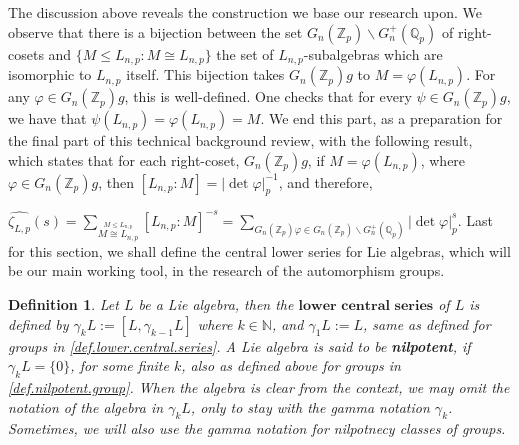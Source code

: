 \documentclass[12pt]{article}
\newtheorem{definition}[theorem]{Definition}
\begin{document}
The discussion above reveals the construction we base our research upon.
We observe that there is a bijection between the set $G_n(\mathbb{Z}_p)\backslash G^+_n(\mathbb{Q}_p)$ of right-cosets and $\{M\leq L_{n,p} : M\cong L_{n,p}\}$ the set of $L_{n,p}$-subalgebras which are isomorphic to $L_{n,p}$ itself. This bijection takes $G_n(\mathbb{Z}_p)g$ to $M=\varphi(L_{n,p})$. For any $\varphi\in G_n(\mathbb{Z}_p)g$, this is well-defined. One checks that for every $\psi\in G_n(\mathbb{Z}_p)g$, we have that $\psi(L_{n,p})=\varphi(L_{n,p})=M$.
We end this part, as a preparation for the final part of this technical background review, with the following result, which states that for each right-coset, $G_n(\mathbb{Z}_p)g$, if $M=\varphi(L_{n,p})$, where $\varphi\in G_n(\mathbb{Z}_p)g$, then $[L_{n,p}:M]=|\det\varphi|_p^{-1}$, and therefore,\par $\hat{\zeta_{L,p}}(s)=\underset{\overset{\scriptscriptstyle M\leq L_{n,p}}{\scriptscriptstyle M\cong L_{n,p}}}{\sum}[L_{n,p}:M]^{-s}=\underset{\scriptscriptstyle G_n(\mathbb{Z}_p)\varphi\in G_n(\mathbb{Z}_p)\backslash G^+_n(\mathbb{Q}_p)}{\sum}|\det\varphi|_p^s$.
Last for this section, we shall define the central lower series for Lie algebras, which will be our main working tool, in the research of the automorphism groups.
\begin{definition}
Let $L$ be a Lie algebra, then the $\textbf{lower central series}$ of $L$ is defined by $\gamma_k L:=[L,\gamma_{k-1}L]$ where $k\in\mathbb{N}$, and $\gamma_1 L:=L$, same as defined for groups in \ref{def.lower.central.series}. A Lie algebra is said to be \textbf{nilpotent}, if $\gamma_k L=\{0\}$, for some finite $k$, also as defined above for groups in \ref{def.nilpotent.group}. When the algebra is clear from the context, we may omit the notation of the algebra in $\gamma_k L$, only to stay with the gamma notation $\gamma_k$. Sometimes, we will also use the gamma notation for nilpotnecy classes of groups.
\end{definition}
\end{document}
